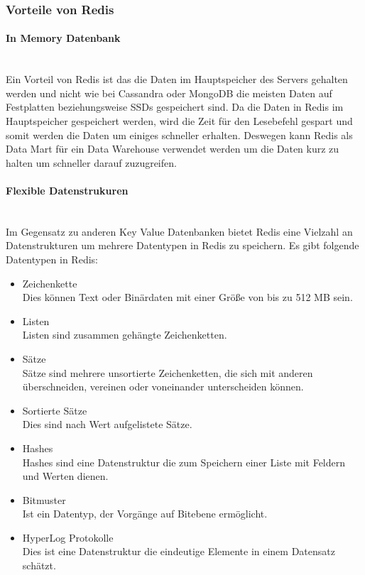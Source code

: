 \subsubsection{Vorteile von Redis}
\paragraph{In Memory Datenbank}\mbox{} \\
Ein Vorteil von Redis ist das die Daten im Hauptspeicher des Servers gehalten werden und nicht wie bei Cassandra oder MongoDB die meisten Daten auf Festplatten beziehungsweise SSDs gespeichert sind. Da die Daten in Redis im Hauptspeicher gespeichert werden, wird die Zeit für den Lesebefehl gespart und somit werden die Daten um einiges schneller erhalten. Deswegen kann Redis als Data Mart für ein Data Warehouse verwendet werden um die Daten kurz zu halten um schneller darauf zuzugreifen. 
\paragraph{Flexible Datenstrukuren}\mbox{} \\
Im Gegensatz zu anderen Key Value Datenbanken bietet Redis eine Vielzahl an Datenstrukturen um mehrere Datentypen in Redis zu speichern. Es gibt folgende Datentypen in Redis:
\begin{itemize}
\item Zeichenkette \mbox{} \\
Dies können Text oder Binärdaten mit einer Größe von bis zu 512 MB sein.
\item Listen \mbox{} \\
Listen sind zusammen gehängte Zeichenketten.
\item Sätze \mbox{} \\
Sätze sind mehrere unsortierte Zeichenketten, die sich mit anderen überschneiden, vereinen oder voneinander unterscheiden können.
\item Sortierte Sätze \mbox{} \\
Dies sind nach Wert aufgelistete Sätze.
\item Hashes \mbox{} \\
Hashes sind eine Datenstruktur die zum Speichern einer Liste mit Feldern und Werten dienen.
\item Bitmuster \mbox{} \\
Ist ein Datentyp, der Vorgänge auf Bitebene ermöglicht.
\item HyperLog Protokolle \mbox{} \\
Dies ist eine Datenstruktur die eindeutige Elemente in einem Datensatz schätzt.
\end{itemize}
